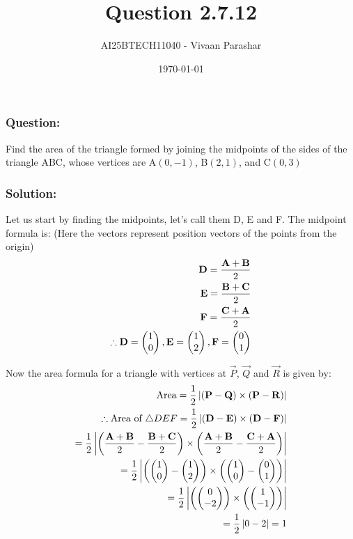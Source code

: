 \documentclass{beamer}
\title{Question 2.7.12}
\author{AI25BTECH11040 - Vivaan Parashar}
\date{\today}
\begin{document}
\frame{\titlepage}

\begin{frame}
    \frametitle{Question: }
    Find the area of the triangle formed by joining the midpoints of the sides of the triangle ABC, whose vertices are A$(0, -1)$, B$(2, 1)$, and C$(0, 3)$
\end{frame}

\begin{frame}
    \frametitle{Solution: }
    Let us start by finding the midpoints, let's call them D, E and F.
    The midpoint formula is: (Here the vectors represent position vectors of the points from the origin)
    \begin{align}
        \mathbf{D} = \frac{\mathbf{A}+\mathbf{B}}{2} \\
        \mathbf{E} = \frac{\mathbf{B}+\mathbf{C}}{2} \\
        \mathbf{F} = \frac{\mathbf{C}+\mathbf{A}}{2} \\
        \therefore \mathbf{D} = \begin{pmatrix}1       \\ 0\end{pmatrix}, \mathbf{E} = \begin{pmatrix}1 \\ 2\end{pmatrix}, \mathbf{F} = \begin{pmatrix}0 \\ 1\end{pmatrix}
    \end{align}
\end{frame}
\begin{frame}
    Now the area formula for a triangle with vertices at $\vec{P}$, $\vec{Q}$ and $\vec{R}$ is given by:
    \begin{align}
        \text{Area} = \frac{1}{2} \left| (\mathbf{P} - \mathbf{Q}) \times (\mathbf{P} - \mathbf{R}) \right|                                                                                        \\
        \therefore \text{Area of } \triangle DEF = \frac{1}{2} \left| (\mathbf{D} - \mathbf{E}) \times (\mathbf{D} - \mathbf{F}) \right|                                                           \\
        = \frac{1}{2} \left| \left( \frac{\mathbf{A}+\mathbf{B}}{2} - \frac{\mathbf{B}+\mathbf{C}}{2} \right) \times \left( \frac{\mathbf{A} + \mathbf{B}}{2} - \frac{\mathbf{C}+\mathbf{A}}{2}\right) \right| \\
        = \frac{1}{2} \left| \left( \begin{pmatrix}1                                                                                                                                           \\ 0\end{pmatrix} - \begin{pmatrix}1 \\ 2\end{pmatrix} \right) \times \left( \begin{pmatrix}1 \\ 0\end{pmatrix} - \begin{pmatrix}0 \\ 1\end{pmatrix} \right) \right|\\
        = \frac{1}{2} \left| \left( \begin{pmatrix}0                                                                                                                                           \\ -2\end{pmatrix} \right) \times \left( \begin{pmatrix}1 \\ -1\end{pmatrix} \right) \right|\\
        = \frac{1}{2} \left| 0 - 2 \right| = 1
    \end{align}
\end{frame}
\end{document}
